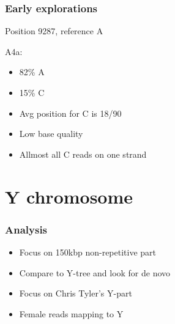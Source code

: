 \documentclass[slidestop,14pt]{beamer}
\begin{document}
\begin{frame}
  \frametitle{Early explorations}



  \vspace{-0.214\paperwidth}

  Position 9287, reference A

  \vspace{\baselineskip}

  \pause

  A4a:
  \begin{itemize}
    \item 82\% {\color{Green} A}
    \item 15\% {\color{Red} C}
    \item<3-> Avg position for {\color{Red} C} is 18/90
    \item<3-> Low base quality
    \item<3-> Allmost all {\color{Red} C} reads on one strand
  \end{itemize}
\end{frame}

\section{Y chromosome}


\begin{frame}
  \frametitle{Analysis}

  \vspace{\baselineskip}

  \begin{itemize}
    \item Focus on 150kbp non-repetitive part
    \item Compare to Y-tree and look for de novo
    \item<2-> Focus on Chris Tyler's Y-part
    \item<2-> Female reads mapping to Y
  \end{itemize}
\end{frame}
\end{document}
